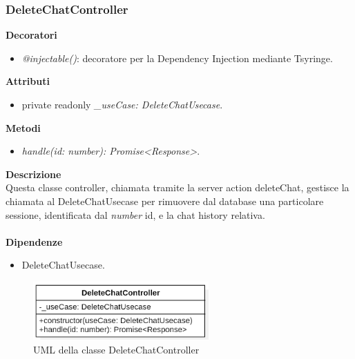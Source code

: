 \subsubsection{DeleteChatController}
\textbf{Decoratori}
\begin{itemize}
    \item \textit{@injectable()}: decoratore per la Dependency Injection mediante Tsyringe.
\end{itemize}
\textbf{Attributi}
\begin{itemize}
    \item private readonly \textit{\_useCase: DeleteChatUsecase}.
\end{itemize}
\textbf{Metodi}
\begin{itemize}
    \item \textit{handle(id: number): Promise<Response>}.
\end{itemize}
\textbf{Descrizione}\\
Questa classe controller, chiamata tramite la server action deleteChat, gestisce la chiamata al DeleteChatUsecase per rimuovere dal database una particolare sessione, identificata dal \textit{number} id, e la chat history relativa.\\ \\
\textbf{Dipendenze}
\begin{itemize}
    \item DeleteChatUsecase.
\end{itemize}

\begin{figure}[h!]
    \centering  
    \includegraphics[width=0.6\textwidth]{DeleteChatController.png}
    \caption{UML della classe DeleteChatController}
\end{figure}

